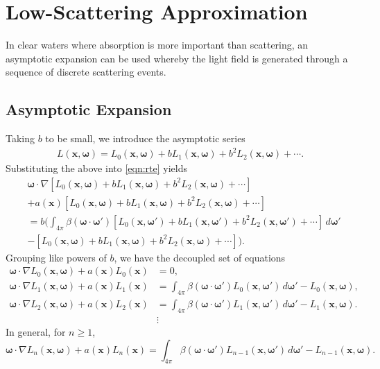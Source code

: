\documentclass[ms,cpyr,lof,lot]{uathesis}
\renewcommand\vec\bm
\begin{document}
\section{Low-Scattering Approximation}
In clear waters where absorption is more important than scattering, an asymptotic expansion can be used whereby the light field is generated through a sequence of discrete scattering events.
\subsection{Asymptotic Expansion}
Taking $b$ to be small, we introduce the asymptotic series
\newcommand{\Lasym}{L_0(\vec{x},\vec{\omega}) + b L_1(\vec{x},\vec{\omega}) + b^2 L_2(\vec{x},\vec{\omega}) + \cdots}
\newcommand{\Lasyms}{L_0(\vec{x_s},\vec{\omega}) + b L_1(\vec{x_s},\vec{\omega}) + b^2 L_2(\vec{x_s},\vec{\omega}) + \cdots}
\newcommand{\Lasymp}{L_0(\vec{x},\vec{\omega}') + b L_1(\vec{x},\vec{\omega}') + b^2 L_2(\vec{x},\vec{\omega}') + \cdots}
\begin{align*}
  L(\vec{x},\vec{\omega}) = \Lasym.
\end{align*}
Substituting the above into \eqref{eqn:rte} yields
\begin{align*}
    &\vec{\omega} \cdot \nabla \left[ \Lasym \right] \\
    &+ a(\vec{x}) \left[ \Lasym \right] \\
    &= b\Bigg(
      \int_{4\pi} \beta(\vec{\omega}\cdot\vec{\omega}')
      \left[ \Lasymp \right] \, d\vec{\omega}' \\
    &- \left[ \Lasym \right]
    \Bigg).
\end{align*}
Grouping like powers of $b$, we have the decoupled set of equations
\begin{align}
  \vec{\omega} \cdot \nabla L_0(\vec{x}, \vec{\omega}) + a(\vec{x})L_0(\vec{x}) &= 0,
  \label{eqn:asymptotics_0}\\
  \vec{\omega} \cdot \nabla L_1(\vec{x}, \vec{\omega}) + a(\vec{x})L_1(\vec{x})
  &= \int_{4\pi} \beta(\vec{\omega}\cdot\vec{\omega}') L_0(\vec{x}, \vec{\omega}')\,d\vec{\omega}' - L_0(\vec{x}, \vec{\omega}), \nonumber\\ 
  \vec{\omega} \cdot \nabla L_2(\vec{x}, \vec{\omega}) + a(\vec{x})L_2(\vec{x})
  &= \int_{4\pi} \beta(\vec{\omega}\cdot\vec{\omega}') L_1(\vec{x}, \vec{\omega}')\,d\vec{\omega}' - L_1(\vec{x}, \vec{\omega}). \nonumber \\ 
  &\vdots \nonumber
\end{align}
In general, for $n \geq 1$,
\begin{equation}
  \vec{\omega} \cdot \nabla L_n(\vec{x}, \vec{\omega}) + a(\vec{x})L_n(\vec{x})
  = \int_{4\pi} \beta(\vec{\omega}\cdot\vec{\omega}') L_{n-1}(\vec{x}, \vec{\omega}')\,d\vec{\omega}' - L_{n-1}(\vec{x}, \vec{\omega}).
  \label{eqn:asymptotics_n}
\end{equation}
\end{document}
